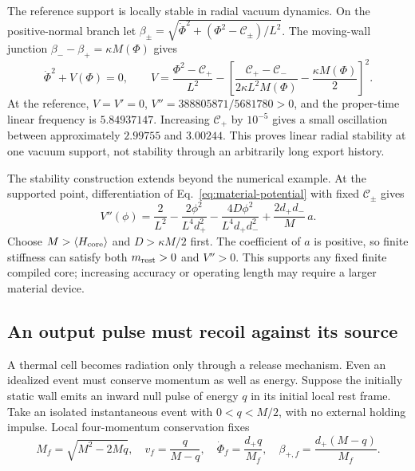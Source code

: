 \documentclass[12pt,a4paper]{article}
\begin{document}
The reference support is locally stable in radial vacuum dynamics.
On the positive-normal branch let
$\beta_\pm=\sqrt{\dot\Phi^2+(\Phi^2-\mathcal C_\pm)/L^2}$.
The moving-wall junction $\beta_--\beta_+=\kappa M(\Phi)$ gives
\begin{equation}\label{eq:material-potential}
 \dot\Phi^2+V(\Phi)=0,\qquad
 V=\frac{\Phi^2-\mathcal C_+}{L^2}
 -\left[\frac{\mathcal C_+-\mathcal C_-}{2\kappa L^2M(\Phi)}
                    -\frac{\kappa M(\Phi)}2\right]^2.
\end{equation}
At the reference, $V=V'=0$, $V''=388805871/5681780>0$, and the proper-time
linear frequency is $5.84937147$. Increasing $\mathcal C_+$ by $10^{-5}$
gives a small oscillation between approximately $2.99755$ and $3.00244$.
This proves linear radial stability at one vacuum support, not stability
through an arbitrarily long export history.

The stability construction extends beyond the numerical example.
At the supported point, differentiation of Eq.~\eqref{eq:material-potential}
with fixed $\mathcal C_\pm$ gives
\begin{equation}\label{eq:material-stiffness}
 V''(\phi)=\frac2{L^2}-\frac{2\phi^2}{L^4d_+^2}
 -\frac{4D\phi^2}{L^4d_+d_-^2}
 +\frac{2d_+d_-}{M}\,a .
\end{equation}
Choose $M>\langle H_{\rm core}\rangle$ and $D>\kappa M/2$ first.
The coefficient of $a$ is positive, so finite stiffness can satisfy both
$m_{\rm rest}>0$ and $V''>0$. This supports any fixed finite compiled core;
increasing accuracy or operating length may require a larger material device.

\subsection{An output pulse must recoil against its source}
\label{sec:material-recoil}

A thermal cell becomes radiation only through a release mechanism.
Even an idealized event must conserve momentum as well as energy.
Suppose the initially static wall emits an inward null pulse of energy
$q$ in its initial local rest frame. Take an isolated instantaneous event
with $0<q<M/2$, with no external holding impulse. Local four-momentum
conservation fixes
\begin{equation}\label{eq:wall-recoil}
 M_f=\sqrt{M^2-2Mq},\quad v_f=\frac q{M-q},\quad
 \dot\Phi_f=\frac{d_+q}{M_f},\quad
 \beta_{+,f}=\frac{d_+(M-q)}{M_f}.
\end{equation}
\end{document}
